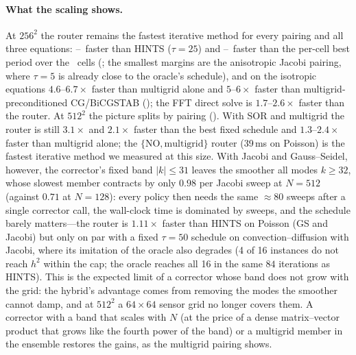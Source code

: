 \paragraph{What the scaling shows.} At $256^2$ the router remains the fastest iterative method for every pairing and all three equations: \caSpHintsBMin--\caSpHintsBMax\ faster than HINTS ($\tau{=}25$) and \caSpBestBMin--\caSpBestBMax\ faster than the per-cell best period over the \caNumCellsB\ cells (; the smallest margins are the anisotropic Jacobi pairing, where $\tau{=}5$ is already close to the oracle's schedule), and on the isotropic equations $4.6$--$6.7\times$ faster than multigrid alone and $5$--$6\times$ faster than multigrid-preconditioned CG/BiCGSTAB (); the FFT direct solve is $1.7$--$2.6\times$ faster than the router. At $512^2$ the picture splits by pairing (). With SOR and multigrid the router is still $3.1\times$ and $2.1\times$ faster than the best fixed schedule and $1.3$--$2.4\times$ faster than multigrid alone; the $\{\mathrm{NO}, \text{multigrid}\}$ router (39\,ms on Poisson) is the fastest iterative method we measured at this size. With Jacobi and Gauss--Seidel, however, the corrector's fixed band $|k|\le 31$ leaves the smoother all modes $k \ge 32$, whose slowest member contracts by only $0.98$ per Jacobi sweep at $N=512$ (against $0.71$ at $N=128$): every policy then needs the same $\approx 80$ sweeps after a single corrector call, the wall-clock time is dominated by sweeps, and the schedule barely matters---the router is $1.11\times$ faster than HINTS on Poisson (GS and Jacobi) but only on par with a fixed $\tau{=}50$ schedule on convection--diffusion with Jacobi, where its imitation of the oracle also degrades (4 of 16 instances do not reach $h^2$ within the cap; the oracle reaches all 16 in the same $84$ iterations as HINTS). This is the expected limit of a corrector whose band does not grow with the grid: the hybrid's advantage comes from removing the modes the smoother cannot damp, and at $512^2$ a $64\times 64$ sensor grid no longer covers them. A corrector with a band that scales with $N$ (at the price of a dense matrix--vector product that grows like the fourth power of the band) or a multigrid member in the ensemble restores the gains, as the multigrid pairing shows.

\begin{table}[H]
\color{red}
\centering
\caption{Scaling: median time to $\varepsilon = h^2$ for the Jacobi and GS pairings against the strongest classical alternatives on each grid (paired median speedup of the learned router over each method in parentheses; $\dagger n$: $n$ instances did not reach the tolerance within the iteration cap).}
\resizebox{\textwidth}{!}{\cascaling}
\label{tab:ca_scaling}
\end{table}

